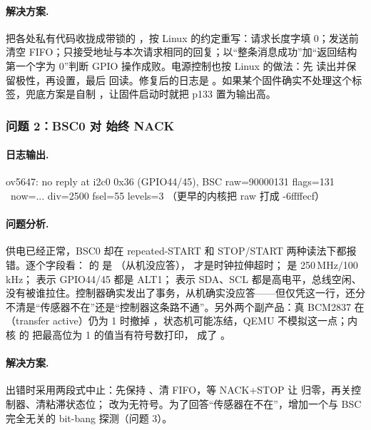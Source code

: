 \paragraph{解决方案.} 把各处私有代码收拢成带锁的 ，按 Linux 的约定重写：请求长度字填 0；发送前清空 FIFO；只接受地址与本次请求相同的回复；以“整条消息成功”加“返回结构第一个字为 0”判断 GPIO 操作成败。电源控制也按 Linux 的做法：先  读出并保留极性，再设置，最后  回读。修复后的日志是 。如果某个固件确实不处理这个标签，兜底方案是自制 ，让固件启动时就把 p133 置为输出高。

\subsubsection{问题 2：BSC0 对  始终 NACK}

\paragraph{日志输出.}
\begin{txtcode}
ov5647: no reply at i2c0 0x36 (GPIO44/45), BSC raw=90000131 flags=131 \
        now=... div=2500 fsel=55 levels=3
（更早的内核把 raw 打成 -6ffffecf）
\end{txtcode}

\paragraph{问题分析.} 供电已经正常，BSC0 却在 repeated-START 和 STOP/START 两种读法下都报错。逐个字段看： 的  是 （从机没应答）， 才是时钟拉伸超时； 是 250\,MHz$/$100\,kHz； 表示 GPIO44/45 都是 ALT1； 表示 SDA、SCL 都是高电平，总线空闲、没有被谁拉住。控制器确实发出了事务，从机确实没应答——但仅凭这一行，还分不清是“传感器不在”还是“控制器这条路不通”。另外两个副产品：真 BCM2837 在 （transfer active）仍为 1 时撤掉 ，状态机可能冻结，QEMU 不模拟这一点；内核  的  把最高位为 1 的值当有符号数打印， 成了 。

\paragraph{解决方案.} 出错时采用两段式中止：先保持 、清 FIFO，等 NACK+STOP 让  归零，再关控制器、清粘滞状态位； 改为无符号。为了回答“传感器在不在”，增加一个与 BSC 完全无关的 bit-bang 探测（问题 3）。


